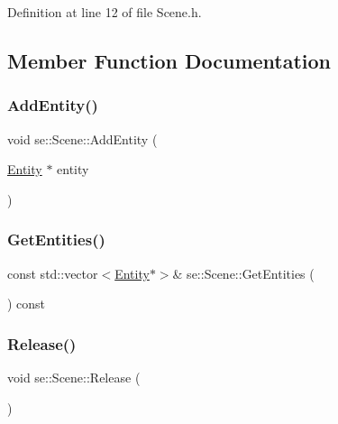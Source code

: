 Definition at line 12 of file Scene.\+h.



\subsection{Member Function Documentation}
\mbox{\label{classse_1_1_scene_a21dde7d731d672d4c424397850864549}} 
\subsubsection{\texorpdfstring{Add\+Entity()}{AddEntity()}}
{\footnotesize\ttfamily void se\+::\+Scene\+::\+Add\+Entity (\begin{DoxyParamCaption}\item[{\mbox{\hyperlink{classse_1_1_entity}{Entity}} $\ast$}]{entity }\end{DoxyParamCaption})}

\mbox{\label{classse_1_1_scene_a1c3f1fc4ab110f9caab190cce13c2e03}} 
\subsubsection{\texorpdfstring{Get\+Entities()}{GetEntities()}}
{\footnotesize\ttfamily const std\+::vector$<$\mbox{\hyperlink{classse_1_1_entity}{Entity}}$\ast$$>$\& se\+::\+Scene\+::\+Get\+Entities (\begin{DoxyParamCaption}{ }\end{DoxyParamCaption}) const}

\mbox{\label{classse_1_1_scene_a9ff2d989fc8a466b0a785f4fa4e446fe}} 
\subsubsection{\texorpdfstring{Release()}{Release()}}
{\footnotesize\ttfamily void se\+::\+Scene\+::\+Release (\begin{DoxyParamCaption}{ }\end{DoxyParamCaption})}


